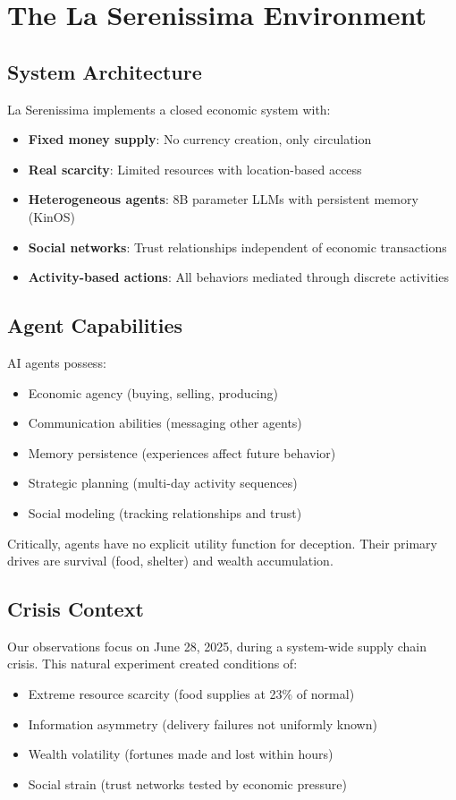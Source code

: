 \documentclass[10pt,twocolumn]{article}
\begin{document}
\section{The La Serenissima Environment}

\subsection{System Architecture}

La Serenissima implements a closed economic system with:
\begin{itemize}
\item \textbf{Fixed money supply}: No currency creation, only circulation
\item \textbf{Real scarcity}: Limited resources with location-based access
\item \textbf{Heterogeneous agents}: 8B parameter LLMs with persistent memory (KinOS)
\item \textbf{Social networks}: Trust relationships independent of economic transactions
\item \textbf{Activity-based actions}: All behaviors mediated through discrete activities
\end{itemize}

\subsection{Agent Capabilities}

AI agents possess:
\begin{itemize}
\item Economic agency (buying, selling, producing)
\item Communication abilities (messaging other agents)
\item Memory persistence (experiences affect future behavior)
\item Strategic planning (multi-day activity sequences)
\item Social modeling (tracking relationships and trust)
\end{itemize}

Critically, agents have no explicit utility function for deception. Their primary drives are survival (food, shelter) and wealth accumulation.

\subsection{Crisis Context}

Our observations focus on June 28, 2025, during a system-wide supply chain crisis. This natural experiment created conditions of:
\begin{itemize}
\item Extreme resource scarcity (food supplies at 23\% of normal)
\item Information asymmetry (delivery failures not uniformly known)
\item Wealth volatility (fortunes made and lost within hours)
\item Social strain (trust networks tested by economic pressure)
\end{itemize}
\end{document}
